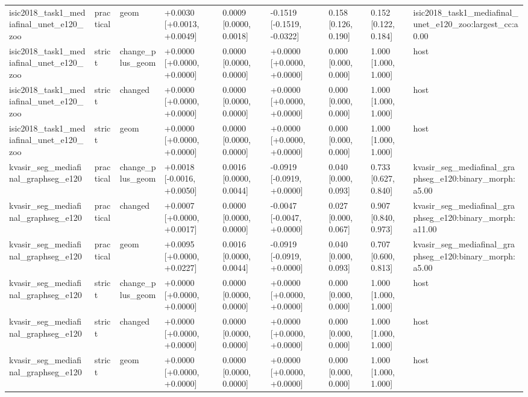\begin{table}[t]
\begin{tabular}{lllllllll}
isic2018\_task1\_mediafinal\_unet\_e120\_zoo & practical & geom & +0.0030 [+0.0013, +0.0049] & 0.0009 [0.0000, 0.0018] & -0.1519 [-0.1519, -0.0322] & 0.158 [0.126, 0.190] & 0.152 [0.122, 0.184] & isic2018\_task1\_mediafinal\_unet\_e120\_zoo:largest\_cc:a0.00 \\
isic2018\_task1\_mediafinal\_unet\_e120\_zoo & strict & change\_plus\_geom & +0.0000 [+0.0000, +0.0000] & 0.0000 [0.0000, 0.0000] & +0.0000 [+0.0000, +0.0000] & 0.000 [0.000, 0.000] & 1.000 [1.000, 1.000] & host \\
isic2018\_task1\_mediafinal\_unet\_e120\_zoo & strict & changed & +0.0000 [+0.0000, +0.0000] & 0.0000 [0.0000, 0.0000] & +0.0000 [+0.0000, +0.0000] & 0.000 [0.000, 0.000] & 1.000 [1.000, 1.000] & host \\
isic2018\_task1\_mediafinal\_unet\_e120\_zoo & strict & geom & +0.0000 [+0.0000, +0.0000] & 0.0000 [0.0000, 0.0000] & +0.0000 [+0.0000, +0.0000] & 0.000 [0.000, 0.000] & 1.000 [1.000, 1.000] & host \\
kvasir\_seg\_mediafinal\_graphseg\_e120 & practical & change\_plus\_geom & +0.0018 [-0.0016, +0.0050] & 0.0016 [0.0000, 0.0044] & -0.0919 [-0.0919, +0.0000] & 0.040 [0.000, 0.093] & 0.733 [0.627, 0.840] & kvasir\_seg\_mediafinal\_graphseg\_e120:binary\_morph:a5.00 \\
kvasir\_seg\_mediafinal\_graphseg\_e120 & practical & changed & +0.0007 [+0.0000, +0.0017] & 0.0000 [0.0000, 0.0000] & -0.0047 [-0.0047, +0.0000] & 0.027 [0.000, 0.067] & 0.907 [0.840, 0.973] & kvasir\_seg\_mediafinal\_graphseg\_e120:binary\_morph:a11.00 \\
kvasir\_seg\_mediafinal\_graphseg\_e120 & practical & geom & +0.0095 [+0.0000, +0.0227] & 0.0016 [0.0000, 0.0044] & -0.0919 [-0.0919, +0.0000] & 0.040 [0.000, 0.093] & 0.707 [0.600, 0.813] & kvasir\_seg\_mediafinal\_graphseg\_e120:binary\_morph:a5.00 \\
kvasir\_seg\_mediafinal\_graphseg\_e120 & strict & change\_plus\_geom & +0.0000 [+0.0000, +0.0000] & 0.0000 [0.0000, 0.0000] & +0.0000 [+0.0000, +0.0000] & 0.000 [0.000, 0.000] & 1.000 [1.000, 1.000] & host \\
kvasir\_seg\_mediafinal\_graphseg\_e120 & strict & changed & +0.0000 [+0.0000, +0.0000] & 0.0000 [0.0000, 0.0000] & +0.0000 [+0.0000, +0.0000] & 0.000 [0.000, 0.000] & 1.000 [1.000, 1.000] & host \\
kvasir\_seg\_mediafinal\_graphseg\_e120 & strict & geom & +0.0000 [+0.0000, +0.0000] & 0.0000 [0.0000, 0.0000] & +0.0000 [+0.0000, +0.0000] & 0.000 [0.000, 0.000] & 1.000 [1.000, 1.000] & host \\

\end{tabular}
\end{table}
